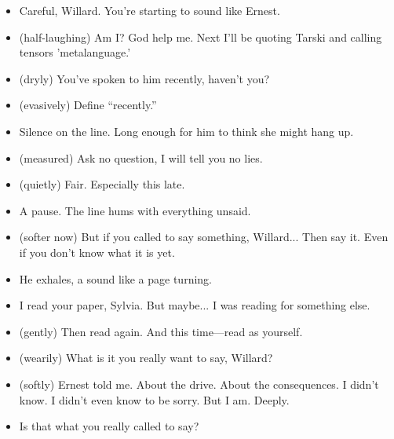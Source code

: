 \begin{itemize}[leftmargin=2cm, label={}]
\item[\textbf{Sylvia:}]  
Careful, Willard. You’re starting to sound like Ernest.

\item[\textbf{Willard :}]  (half-laughing)
Am I? God help me.  
Next I’ll be quoting Tarski and calling tensors 'metalanguage.'

\item[\textbf{Sylvia :}]  (dryly)
You’ve spoken to him recently, haven’t you?

\item[\textbf{Willard :}] (evasively) 
Define “recently.”


\item[] Silence on the line. Long enough for him to think she might hang up.

\item[\textbf{Sylvia :}] (measured) 
Ask no question, I will tell you no lies.

\item[\textbf{Willard :}] (quietly) 
Fair. Especially this late.

\item[] A pause. The line hums with everything unsaid.

\item[\textbf{Sylvia :}] (softer now)  
But if you called to say something, Willard...  
Then say it. Even if you don’t know what it is yet.

\item[] He exhales, a sound like a page turning.

\item[\textbf{Willard:}]  
I read your paper, Sylvia.  
But maybe... I was reading for something else.


\item[\textbf{Sylvia :}]  (gently)
Then read again.  
And this time—read as yourself.

\item[\textbf{Sylvia :}]  (wearily)
What is it you really want to say, Willard?

\item[\textbf{Willard :}]  
(softly) Ernest told me. About the drive. About the consequences.  
I didn’t know. I didn’t even know to be sorry. But I am. Deeply.

\item[\textbf{Sylvia:}]  
Is that what you really called to say?


\end{itemize}
